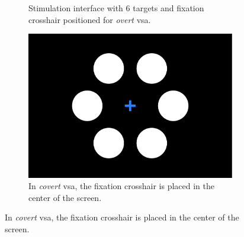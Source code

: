 \documentclass[twocolumn]{article}
\begin{document}
\begin{figure}
\begin{minipage}[b]{.54\textwidth}
\begin{subfigure}[b]{.45\linewidth}
			\caption{Stimulation interface with 6 targets and fixation crosshair
				positioned for \emph{overt} \ac{vsa}.}
		\end{subfigure}\hfill%
		\begin{subfigure}[b]{.45\linewidth}
			\includegraphics[width=\textwidth]{figures/stim_covert.pdf}
			\caption{In \emph{covert} \ac{vsa}, the fixation crosshair is placed in the
				center of the screen.}
		\end{subfigure}
		\smallskip


\end{minipage}
\end{figure}
\end{document}

